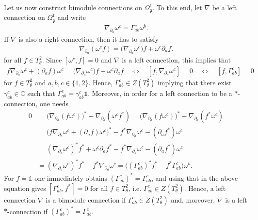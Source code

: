 \documentclass{amsart}
\newcommand{\complex}{\mathbb{C}}
\newcommand{\paraa}[1]{\big(#1\big)}
\newcommand{\spacearound}[1]{\quad#1\quad}
\newcommand{\equivalent}{\spacearound{\Leftrightarrow}}
\theoremstyle{definition}
\theoremstyle{remark}
\numberwithin{equation}{section}
\renewcommand{\mid}{\mathds{1}}
\renewcommand{\d}{\partial}
\newcommand{\g}{\mathfrak{g}}
\newcommand{\Omegaoneg}{\Omega^1_{\g}}
\newcommand{\Ttwotheta}{T^2_{\theta}}
\begin{document}
Let us now construct bimodule connections on $\Omegaoneg$. To this
end, let $\nabla$ be a left connection on $\Omegaoneg$ and write
\begin{align*}
  \nabla_{\d_a}\omega^c = \Gamma^c_{ab}\omega^b.
\end{align*}
If $\nabla$ is also a right connection, then it has to satisfy
\begin{align*}
  \nabla_{\d_a}(\omega^c f) = \paraa{\nabla_{\d_a}\omega^c}f + \omega^c\d_af.
\end{align*}
for all $f\in\Ttwotheta$. Since $[\omega^c,f]=0$ and $\nabla$ is a left connection, this implies that
\begin{align*}
  f\nabla_{\d_a}\omega^c + (\d_af)\omega^c = \paraa{\nabla_{\d_a}\omega^c}f + \omega^c\d_af\equivalent
  [f,\nabla_{\d_a}\omega^c] = 0\equivalent
  [f,\Gamma^c_{ab}] = 0
\end{align*}
for $f\in\Ttwotheta$ and $a,b,c\in\{1,2\}$. Hence,
$\Gamma^c_{ab}\in Z(\Ttwotheta)$ implying that there exist
$\gamma^c_{ab}\in\complex$ such that
$\Gamma^c_{ab} = \gamma^c_{ab}\mid$. Moreover, in order for a left
connection to be a $\ast$-connection, one needs
\begin{align*}
  0 &= \paraa{\nabla_{\d_a}(f\omega^c)}^\ast-\nabla_{\d_a}(\omega^cf^\ast)
      =\paraa{\nabla_{\d_a}(f\omega^c)}^\ast-\nabla_{\d_a}(f^\ast\omega^c)\\
    &=\paraa{f\nabla_{\d_a}\omega^c+(\d_af)\omega^c}^\ast-f^\ast\nabla_{\d_a}\omega^c-(\d_af^\ast)\omega^c\\
    &=(\nabla_{\d_a}\omega^c)^\ast f^\ast + \omega^c\d_af^\ast-f^\ast\nabla_{\d_a}\omega^c-(\d_af^\ast)\omega^c\\
    &= (\nabla_{\d_a}\omega^c)^\ast f^\ast-f^\ast\nabla_{\d_a}\omega^c
    = \paraa{(\Gamma^c_{ab})^\ast f^\ast -f^\ast\Gamma^{c}_{ab}}\omega^b.
\end{align*}
For $f=\mid$ one immediately obtains
$(\Gamma^c_{ab})^\ast=\Gamma^c_{ab}$, and using that in the above
equation gives $[\Gamma^c_{ab},f^\ast]=0$ for all $f\in\Ttwotheta$,
i.e. $\Gamma^c_{ab}\in Z(\Ttwotheta)$. Hence, a left connection
$\nabla$ is a bimodule connection if $\Gamma^c_{ab}\in Z(\Ttwotheta)$
and, moreover, $\nabla$ is a left $\ast$-connection if
$(\Gamma^c_{ab})^\ast=\Gamma_{ab}^c$.
\end{document}
